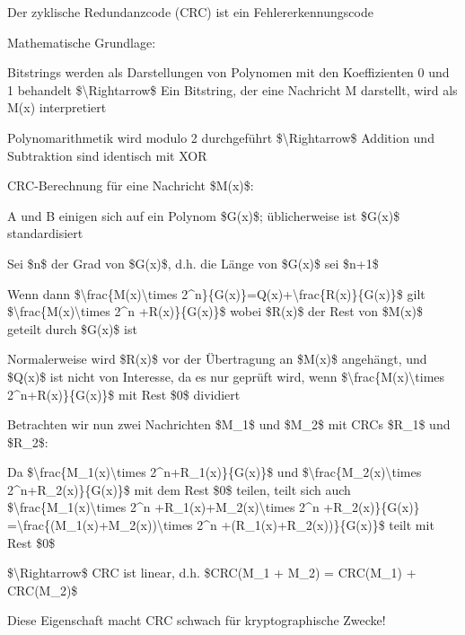\documentclass[a4paper]{article}
\begin{document}
\begin{multicols}{3}
      \begin{itemize*}
            \item Der zyklische Redundanzcode (CRC) ist ein Fehlererkennungscode
            \item Mathematische Grundlage:
            \begin{itemize*}
                  \item Bitstrings werden als Darstellungen von Polynomen mit den Koeffizienten 0 und 1 behandelt \$\textbackslash Rightarrow\$ Ein Bitstring, der eine Nachricht M darstellt, wird als M(x) interpretiert
                  \item Polynomarithmetik wird modulo 2 durchgeführt \$\textbackslash Rightarrow\$ Addition und Subtraktion sind identisch mit XOR
            \end{itemize*}
            \item CRC-Berechnung für eine Nachricht \$M(x)\$:
            \begin{itemize*}
                  \item A und B einigen sich auf ein Polynom \$G(x)\$; üblicherweise ist \$G(x)\$ standardisiert
                  \item Sei \$n\$ der Grad von \$G(x)\$, d.h. die Länge von \$G(x)\$ sei \$n+1\$
                  \item Wenn dann \$\textbackslash frac\{M(x)\textbackslash times 2\^{}n\}\{G(x)\}=Q(x)+\textbackslash frac\{R(x)\}\{G(x)\}\$ gilt \$\textbackslash frac\{M(x)\textbackslash times 2\^{}n +R(x)\}\{G(x)\}\$ wobei \$R(x)\$ der Rest von \$M(x)\$ geteilt durch \$G(x)\$ ist
                  \item Normalerweise wird \$R(x)\$ vor der Übertragung an \$M(x)\$ angehängt, und \$Q(x)\$ ist nicht von Interesse, da es nur geprüft wird, wenn \$\textbackslash frac\{M(x)\textbackslash times 2\^{}n+R(x)\}\{G(x)\}\$ mit Rest \$0\$ dividiert
            \end{itemize*}
            \item Betrachten wir nun zwei Nachrichten \$M\_1\$ und \$M\_2\$ mit CRCs
            \$R\_1\$ und \$R\_2\$:
            \begin{itemize*}
                  \item Da \$\textbackslash frac\{M\_1(x)\textbackslash times 2\^{}n+R\_1(x)\}\{G(x)\}\$ und \$\textbackslash frac\{M\_2(x)\textbackslash times 2\^{}n+R\_2(x)\}\{G(x)\}\$ mit dem Rest \$0\$ teilen, teilt sich auch \$\textbackslash frac\{M\_1(x)\textbackslash times 2\^{}n +R\_1(x)+M\_2(x)\textbackslash times 2\^{}n +R\_2(x)\}\{G(x)\} =\textbackslash frac\{(M\_1(x)+M\_2(x))\textbackslash times 2\^{}n +(R\_1(x)+R\_2(x))\}\{G(x)\}\$ teilt mit Rest \$0\$
                  \item \$\textbackslash Rightarrow\$ CRC ist linear, d.h. \$CRC(M\_1 + M\_2) = CRC(M\_1) + CRC(M\_2)\$
            \end{itemize*}
            \item Diese Eigenschaft macht CRC schwach für kryptographische Zwecke!
      \end{itemize*}



\end{multicols}
\end{document}
